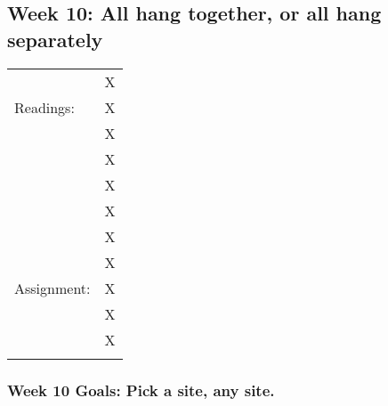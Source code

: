 \documentclass[]{article}
\begin{document}
\subsection{Week 10: All hang together, or all hang
separately}\label{week-10-all-hang-together-or-all-hang-separately}

\begin{longtable}[c]{@{}ll@{}}
\toprule\addlinespace
& X
\\\addlinespace
Readings: & X
\\\addlinespace
& X
\\\addlinespace
& X
\\\addlinespace
& X
\\\addlinespace
& X
\\\addlinespace
& X
\\\addlinespace
& X
\\\addlinespace
Assignment: & X
\\\addlinespace
& X
\\\addlinespace
& X
\\\addlinespace
\bottomrule
\end{longtable}

\subsubsection{Week 10 Goals: Pick a site, any
site.}\label{week-10-goals-pick-a-site-any-site.}
\end{document}
